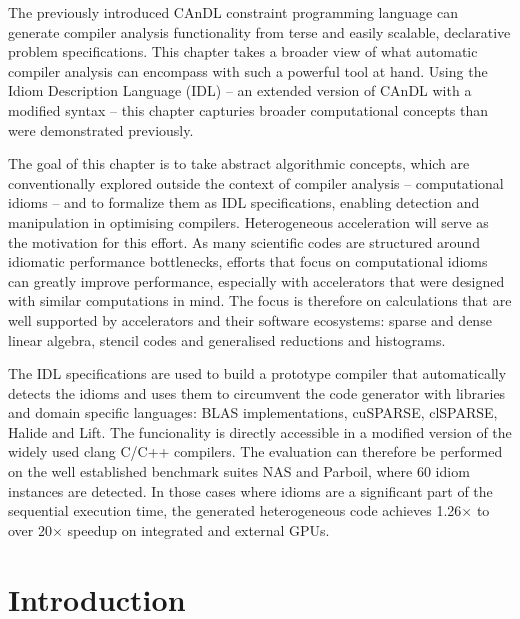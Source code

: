 
    The previously introduced CAnDL constraint programming language can generate
    compiler analysis functionality from terse and easily scalable, declarative
    problem specifications.
    This chapter takes a broader view of what automatic compiler analysis can
    encompass with such a powerful tool at hand.
    Using the Idiom Description Language (IDL) -- an extended version of CAnDL
    with a modified syntax -- this chapter capturies broader computational
    concepts than were demonstrated previously.

    The goal of this chapter is to take abstract algorithmic concepts, which are
    conventionally explored outside the context of compiler analysis --
    computational idioms -- and to formalize them as IDL specifications,
    enabling detection and manipulation in optimising compilers.
    Heterogeneous acceleration will serve as the motivation for this effort.
    As many scientific codes are structured around idiomatic performance
    bottlenecks, efforts that focus on computational idioms can greatly
    improve performance, especially with accelerators that were designed
    with similar computations in mind.
    The focus is therefore on calculations that are well supported by
    accelerators and their software ecosystems: sparse and dense linear algebra,
    stencil codes and generalised reductions and histograms.

    The IDL specifications are used to build a prototype compiler that
    automatically detects the idioms and uses them to circumvent the code
    generator with libraries and domain specific languages:
    BLAS implementations, cuSPARSE, clSPARSE, Halide and Lift.
    The funcionality is directly accessible in a modified version of the widely
    used clang C/C++ compilers.
    The evaluation can therefore be performed on the well established benchmark
    suites NAS and Parboil, where 60 idiom instances are detected.
    In those cases where idioms are a significant part of the sequential
    execution time, the generated heterogeneous code achieves 1.26$\times$ to
    over 20$\times$ speedup on integrated and external GPUs.

\section{Introduction}

